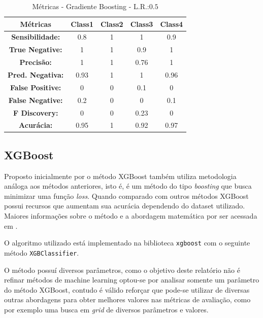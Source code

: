 \documentclass[
	article,			%
	11pt,				%
	oneside,			%
	a4paper,			%
	english,			%
	brazil,				%
	sumario=tradicional
	]{abntex2}
\begin{document}
\begin{table}[H]
\centering
\begin{tabular}{|c|c|c|c|c|}
\hline
\textbf{Métricas}        & \textbf{Class1} & \textbf{Class2} & \textbf{Class3} & \textbf{Class4} \\ \hline
\textbf{Sensibilidade:}  & 0.8             & 1               & 1               & 0.9             \\ \hline
\textbf{True Negative:}  & 1               & 1               & 0.9             & 1               \\ \hline
\textbf{Precisão:}       & 1               & 1               & 0.76            & 1               \\ \hline
\textbf{Pred. Negativa:} & 0.93            & 1               & 1               & 0.96            \\ \hline
\textbf{False Positive:} & 0               & 0               & 0.1             & 0               \\ \hline
\textbf{False Negative:} & 0.2             & 0               & 0               & 0.1             \\ \hline
\textbf{F Discovery:}    & 0               & 0               & 0.23            & 0               \\ \hline
\textbf{Acurácia:}       & 0.95            & 1               & 0.92            & 0.97            \\ \hline
\end{tabular}
\caption{Métricas - Gradiente Boosting - L.R.:$0.5$}
\label{tab:metrics_gb}
\end{table}

\newpage
\subsection{XGBoost}


Proposto inicialmente por \cite{Chen2016} o método XGBoost também utiliza metodologia análoga aos métodos anteriores, isto é, é um método do tipo \textit{boosting} que busca minimizar uma função \textit{loss}. Quando comparado com outros métodos XGBoost possui recursos que aumentam sua acurácia dependendo do dataset utilizado. Maiores informações sobre o método e a abordagem matemática por ser acessada em \cite{Chen2016}.

O algoritmo utilizado está implementado na biblioteca \verb|xgboost| com o seguinte método \verb|XGBClassifier|. 

O método possuí diversos parâmetros, como o objetivo deste relatório não é refinar métodos de machine learning optou-se por analisar somente um parâmetro do método XGBoost, contudo é válido reforçar que pode-se utilizar de diversas outras abordagens para obter melhores valores nas métricas de avaliação, como por exemplo uma busca em \textit{grid} de diversos parâmetros e valores.
\end{document}
